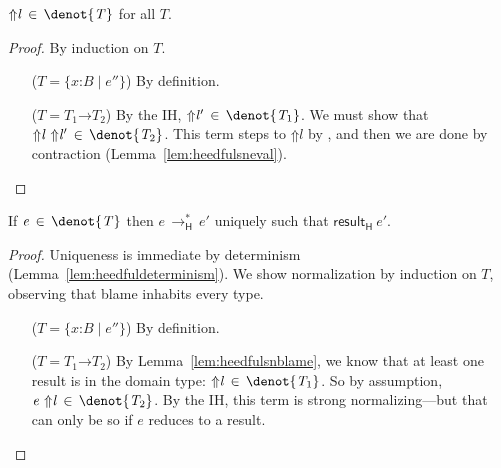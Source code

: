 \documentclass[9pt]{extarticle}
\newcommand{\ottnt}[1]{\mathit{#1}}
\newcommand{\ottsym}[1]{#1}
\begin{document}
{\begin{lemma}
  \label{lem:heedfulsnblame}
  $ \mathord{\Uparrow}  \ottnt{l}  \, \in \,  \denot{ \ottnt{T} } $ for all $\ottnt{T}$.
\begin{proof}
    By induction on $\ottnt{T}$.
\begin{itemize}
    \item[($\ottnt{T}  \ottsym{=}   \{ \mathit{x} \mathord{:} \ottnt{B} \mathrel{\mid} \ottnt{e''} \} $)] By definition.
    \item[($\ottnt{T}  \ottsym{=}   \ottnt{T_{{\mathrm{1}}}} \mathord{ \rightarrow } \ottnt{T_{{\mathrm{2}}}} $)] By the IH, $ \mathord{\Uparrow}  \ottnt{l'}  \, \in \,  \denot{ \ottnt{T_{{\mathrm{1}}}} } $. We
      must show that $  \mathord{\Uparrow}  \ottnt{l}  ~  \mathord{\Uparrow}  \ottnt{l'}   \, \in \,  \denot{ \ottnt{T_{{\mathrm{2}}}} } $. This term
      steps to $ \mathord{\Uparrow}  \ottnt{l} $ by , and then we are done
      by contraction (Lemma~\ref{lem:heedfulsneval}).
    \end{itemize}
  \end{proof}
\end{lemma}

\begin{lemma}
  \label{lem:heedfulsn}
  If $\ottnt{e} \, \in \,  \denot{ \ottnt{T} } $ then $\ottnt{e} \,  \longrightarrow ^{*}_{  \mathsf{H}  }  \, \ottnt{e'}$ uniquely such that
  $ \mathsf{result} _{  \mathsf{H}  }~ \ottnt{e'} $.
\begin{proof}
    Uniqueness is immediate by determinism\iffull
    (Lemma~\ref{lem:heedfuldeterminism})\fi. We show normalization by
    induction on $\ottnt{T}$, observing that blame inhabits every type.
{\iffull
    \begin{itemize}
    \item[($\ottnt{T}  \ottsym{=}   \{ \mathit{x} \mathord{:} \ottnt{B} \mathrel{\mid} \ottnt{e''} \} $)] By definition.
    \item[($\ottnt{T}  \ottsym{=}   \ottnt{T_{{\mathrm{1}}}} \mathord{ \rightarrow } \ottnt{T_{{\mathrm{2}}}} $)] By Lemma~\ref{lem:heedfulsnblame}, we know
      that at least one result is in the domain type: $ \mathord{\Uparrow}  \ottnt{l}  \, \in \,  \denot{ \ottnt{T_{{\mathrm{1}}}} } $. So by assumption, $ \ottnt{e} ~  \mathord{\Uparrow}  \ottnt{l}   \, \in \,  \denot{ \ottnt{T_{{\mathrm{2}}}} } $. By the
      IH, this term is strong normalizing---but that can only be so if
      $\ottnt{e}$ reduces to a result.
    \end{itemize}
    \fi}
  \end{proof}
\end{lemma}

}
\end{document}
